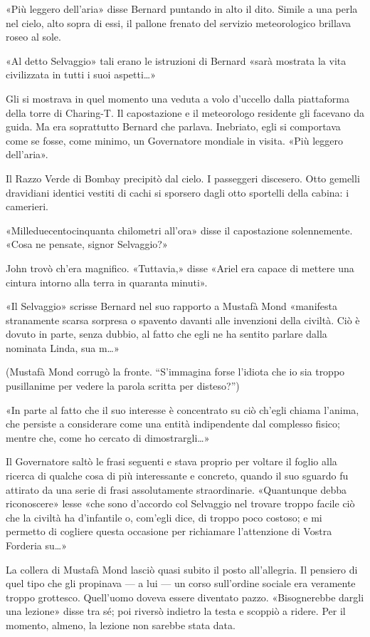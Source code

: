 \documentclass[
a5paper, %
10pt, %
twoside, 
onecolumn, %
openany, %
]{memoir}
\begin{document}
«Più leggero dell’aria» disse Bernard puntando in alto il dito. Simile a una perla nel cielo, alto sopra di essi, il pallone frenato del servizio meteorologico brillava roseo al sole.

«Al detto Selvaggio» tali erano le istruzioni di Bernard «sarà mostrata la vita civilizzata in tutti i suoi aspetti…»

Gli si mostrava in quel momento una veduta a volo d’uccello dalla piattaforma della torre di Charing-T. Il capostazione e il meteorologo residente gli facevano da guida. Ma era soprattutto Bernard che parlava. Inebriato, egli si comportava come se fosse, come minimo, un Governatore mondiale in visita. «Più leggero dell’aria».

Il Razzo Verde di Bombay precipitò dal cielo. I passeggeri discesero. Otto gemelli dravidiani identici vestiti di cachi si sporsero dagli otto sportelli della cabina: i camerieri.

«Milleduecentocinquanta chilometri all’ora» disse il capostazione solennemente. «Cosa ne pensate, signor Selvaggio?»

John trovò ch’era magnifico. «Tuttavia,» disse «Ariel era capace di mettere una cintura intorno alla terra in quaranta minuti».

«Il Selvaggio» scrisse Bernard nel suo rapporto a Mustafà Mond «manifesta stranamente scarsa sorpresa o spavento davanti alle invenzioni della civiltà. Ciò è dovuto in parte, senza dubbio, al fatto che egli ne ha sentito parlare dalla nominata Linda, sua m…»

(Mustafà Mond corrugò la fronte. “S’immagina forse l’idiota che io sia troppo pusillanime per vedere la parola scritta per disteso?”)

«In parte al fatto che il suo interesse è concentrato su ciò ch’egli chiama l’anima, che persiste a considerare come una entità indipendente dal complesso fisico; mentre che, come ho cercato di dimostrargli…»

Il Governatore saltò le frasi seguenti e stava proprio per voltare il foglio alla ricerca di qualche cosa di più interessante e concreto, quando il suo sguardo fu attirato da una serie di frasi assolutamente straordinarie. «Quantunque debba riconoscere» lesse «che sono d’accordo col Selvaggio nel trovare troppo facile ciò che la civiltà ha d’infantile o, com’egli dice, di troppo poco costoso; e mi permetto di cogliere questa occasione per richiamare l’attenzione di Vostra Forderia su…»

La collera di Mustafà Mond lasciò quasi subito il posto all’allegria. Il pensiero di quel tipo che gli propinava — a lui — un corso sull’ordine sociale era veramente troppo grottesco. Quell’uomo doveva essere diventato pazzo. «Bisognerebbe dargli una lezione» disse tra sé; poi riversò indietro la testa e scoppiò a ridere. Per il momento, almeno, la lezione non sarebbe stata data.
\end{document}
